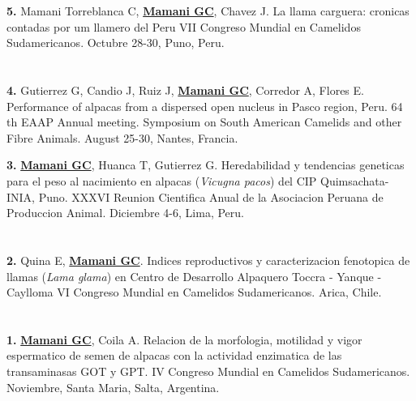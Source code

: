\documentclass[margin,line,10pt]{res}
\newenvironment{list1}{
  \begin{list}{\ding{113}}{%
      \setlength{\itemsep}{0in}
      \setlength{\parsep}{0in} \setlength{\parskip}{0in}
      \setlength{\topsep}{0in} \setlength{\partopsep}{0in} 
      \setlength{\leftmargin}{0.17in}}}{\end{list}}
\begin{document}
\begin{resume}
\begin{list1}
\item [\bf{5}.] Mamani Torreblanca C, {\bf \underline{Mamani GC}}, Chavez J.
La llama carguera: cronicas contadas por um llamero del Peru
VII Congreso Mundial en Camelidos Sudamericanos. Octubre 28-30, Puno, Peru. 
\end{list1}
\vspace{0.5cm}

\section{}
\begin{list1}
\item [\bf{4}.] Gutierrez G, Candio J, Ruiz J, {\bf \underline{Mamani GC}}, Corredor A, Flores E.
Performance of alpacas from a dispersed open nucleus in Pasco region, Peru.
64 th EAAP Annual meeting. Symposium on South American Camelids and other Fibre Animals. August 25-30, Nantes, Francia. 
\vspace{0.5cm}

\item [\bf{3}.] {\bf \underline{Mamani GC}}, Huanca T, Gutierrez G.
Heredabilidad y tendencias geneticas para el peso al nacimiento en alpacas (\textit{Vicugna pacos}) del CIP Quimsachata-INIA, Puno.
XXXVI Reunion Cientifica Anual de la Asociacion Peruana de Produccion Animal. Diciembre 4-6, Lima, Peru. 
\end{list1}
\vspace{0.5cm}

\section{}
\begin{list1}
\item [\bf{2}.] Quina E, {\bf \underline{Mamani GC}}.
Indices reproductivos y caracterizacion fenotopica de llamas (\textit{Lama glama}) en Centro de Desarrollo Alpaquero Toccra - Yanque -Caylloma
VI Congreso Mundial en Camelidos Sudamericanos. Arica, Chile. 
\end{list1}
\vspace{0.5cm}

\section{}
\begin{list1}
\item [\bf{1}.] {\bf \underline{Mamani GC}}, Coila A.
Relacion de la morfologia, motilidad y vigor espermatico de semen de alpacas con la actividad enzimatica de las transaminasas GOT y GPT.
IV Congreso Mundial en Camelidos Sudamericanos. Noviembre, Santa Maria, Salta, Argentina. 
\end{list1}


\end{resume}
\end{document}
